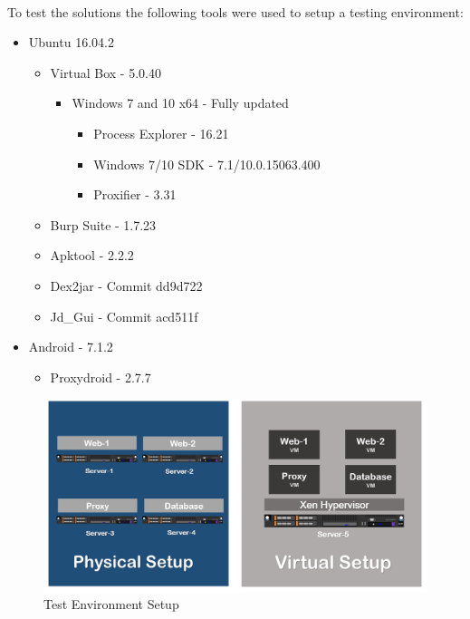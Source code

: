 \paragraph{}
To test the solutions the following tools were used to setup a testing environment:
\begin{itemize}
    \item Ubuntu 16.04.2
    \begin{itemize}
        \item Virtual Box - 5.0.40
        \begin{itemize}
            \item Windows 7 and 10 x64 - Fully updated
            \begin{itemize}
                \item Process Explorer - 16.21
                \item Windows 7/10 SDK - 7.1/10.0.15063.400
                \item Proxifier - 3.31
            \end{itemize}
        \end{itemize}
        \item Burp Suite - 1.7.23
        \item Apktool - 2.2.2
        \item Dex2jar - Commit dd9d722
        \item Jd\_Gui - Commit acd511f
    \end{itemize}
    \item Android - 7.1.2
    \begin{itemize}
        \item Proxydroid - 2.7.7
    \end{itemize}
\end{itemize}

\begin{figure}[H]
    \centering
    \includegraphics[width=14cm]{Pictures/setup.PNG}
    \caption{Test Environment Setup}
    \label{fig:QQ3}
\end{figure}

